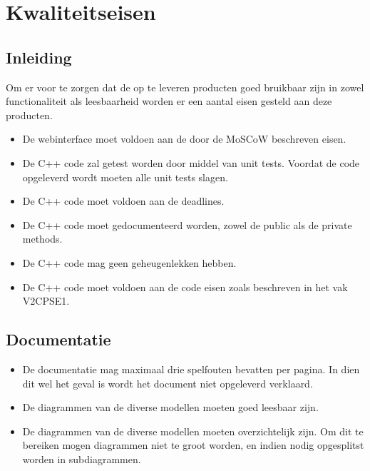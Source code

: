 \chapter{Kwaliteitseisen}
\section{Inleiding}
Om er voor te zorgen dat de op te leveren producten goed bruikbaar zijn in zowel functionaliteit als leesbaarheid worden er een aantal eisen gesteld aan deze producten.

\begin{itemize}
\section{Software}
	\item De webinterface moet voldoen aan de door de MoSCoW beschreven eisen.
	\item De C++ code zal getest worden door middel van unit tests. Voordat de code opgeleverd wordt moeten alle unit tests slagen.
	\item De C++ code moet voldoen aan de deadlines.
	\item De C++ code moet gedocumenteerd worden, zowel de public als de private methods.
	\item De C++ code mag geen geheugenlekken hebben.
	\item De C++ code moet voldoen aan de code eisen zoals beschreven in het vak V2CPSE1.
\end{itemize}

\section{Documentatie}
\begin{itemize}
	\item De documentatie mag maximaal drie spelfouten bevatten per pagina. In dien dit wel het geval is wordt het document niet opgeleverd verklaard.
	\item De diagrammen van de diverse modellen moeten goed leesbaar zijn. 
	\item De diagrammen van de diverse modellen moeten overzichtelijk zijn. Om dit te bereiken mogen diagrammen niet te groot worden, en indien nodig opgesplitst worden in subdiagrammen.
\end{itemize}
